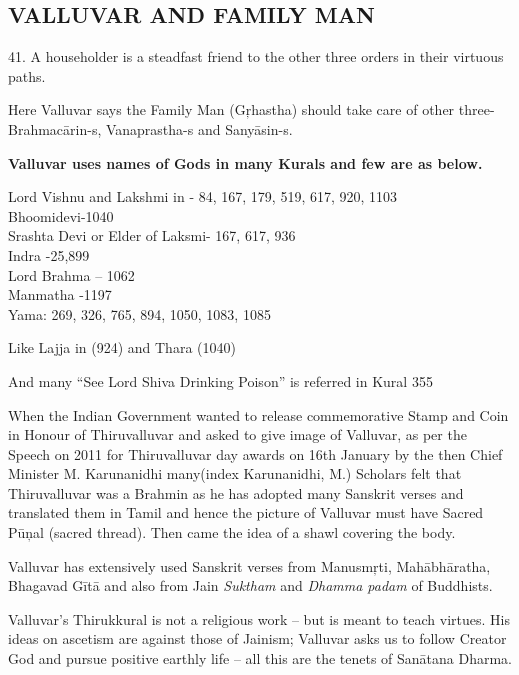 \subsection*{VALLUVAR AND FAMILY MAN}

41.\endnote{} A householder is a steadfast friend to the other three orders in their virtuous paths.

Here Valluvar says the Family Man (Gŗhastha) should take care of other three- Brahmacārin-s, Vanaprastha-s and Sanyāsin-s.

\textbf{Valluvar uses names of Gods in many Kurals and few are as below.}

Lord Vishnu and Lakshmi in - 84, 167, 179, 519, 617, 920, 1103\\ Bhoomidevi-1040\\ Srashta Devi or Elder of Laksmi- 167, 617, 936\\ Indra -25,899\\ Lord Brahma – 1062\\ Manmatha -1197\\ Yama: 269, 326, 765, 894, 1050, 1083, 1085

Like Lajja in  (924) and Thara  (1040)

And many “See Lord Shiva Drinking Poison” is referred in Kural 355

When the Indian Government wanted to release commemorative Stamp and Coin in Honour of Thiruvalluvar and asked to give image of Valluvar, as per the Speech on 2011 for Thiruvalluvar day awards on 16th January by the then Chief Minister M. Karunanidhi\endnote{} many(index Karunanidhi, M.) Scholars felt that Thiruvalluvar was a Brahmin as he has adopted many Sanskrit verses and translated them in Tamil and hence the picture of Valluvar must have Sacred Pūņal (sacred thread). Then came the idea of a shawl covering the body.

Valluvar has extensively used Sanskrit verses from Manusmŗti, Mahābhāratha, Bhagavad Gītā and also from Jain \textit{Suktham} and \textit{Dhamma padam} of Buddhists.

Valluvar’s Thirukkural is not a religious work – but is meant to teach virtues. His ideas on ascetism are against those of Jainism; Valluvar asks us to follow Creator God and pursue positive earthly life -- all this are the tenets of Sanātana Dharma.

